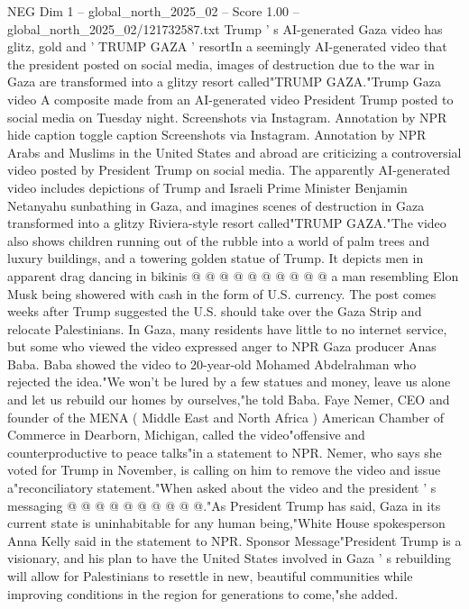 \begin{textsample}{NEG Dim 1 – global\_north\_2025\_02 – Score 1.00 – global\_north\_2025\_02/121732587.txt}  \label{ex:f1_neg_009}
Trump ' s AI-generated Gaza video has glitz, gold and ' TRUMP GAZA ' resortIn a seemingly AI-generated video that the president posted on social media, images of destruction due to the war in Gaza are transformed into a glitzy resort called"TRUMP GAZA."Trump Gaza video A composite made from an AI-generated video President Trump posted to social media on Tuesday night.
Screenshots via Instagram.
Annotation by NPR hide caption toggle caption Screenshots via Instagram.
Annotation by NPR Arabs and Muslims in the United States and abroad are criticizing a controversial video posted by President Trump on social media.
The apparently AI-generated video includes depictions of Trump and Israeli Prime Minister Benjamin Netanyahu sunbathing in Gaza, and imagines scenes of destruction in Gaza transformed into a glitzy Riviera-style resort called"TRUMP GAZA."The video also shows children running out of the rubble into a world of palm trees and luxury buildings, and a towering golden statue of Trump.
It depicts men in apparent drag dancing in bikinis @ @ @ @ @ @ @ @ @ @ a man resembling Elon Musk being showered with cash in the form of U.S. currency.
The post comes weeks after Trump suggested the U.S. should take over the Gaza Strip and relocate Palestinians.
In Gaza, many residents have little to no internet service, but some who viewed the video expressed anger to NPR Gaza producer Anas Baba.
Baba showed the video to 20-year-old Mohamed Abdelrahman who rejected the idea."We won't be lured by a few statues and money, leave us alone and let us rebuild our homes by ourselves,"he told Baba.
Faye Nemer, CEO and founder of the MENA ( Middle East and North Africa ) American Chamber of Commerce in Dearborn, Michigan, called the video"offensive and counterproductive to peace talks"in a statement to NPR.
Nemer, who says she voted for Trump in November, is calling on him to remove the video and issue a"reconciliatory statement."When asked about the video and the president ' s messaging @ @ @ @ @ @ @ @ @ @."As President Trump has said, Gaza in its current state is uninhabitable for any human being,"White House spokesperson Anna Kelly said in the statement to NPR.
Sponsor Message"President Trump is a visionary, and his plan to have the United States involved in Gaza ' s rebuilding will allow for Palestinians to resettle in new, beautiful communities while improving conditions in the region for generations to come,"she added.

\end{textsample}
